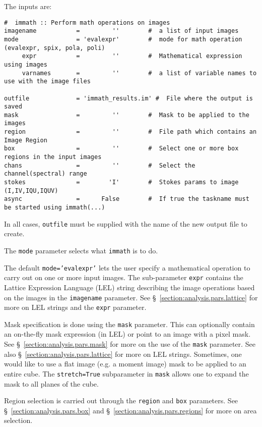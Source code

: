 The inputs are:
\small
\begin{verbatim}
#  immath :: Perform math operations on images
imagename           =         ''        #  a list of input images
mode                = 'evalexpr'        #  mode for math operation (evalexpr, spix, pola, poli)
     expr           =         ''        #  Mathematical expression using images
     varnames       =         ''        #  a list of variable names to use with the image files

outfile             = 'immath_results.im' #  File where the output is saved
mask                =         ''        #  Mask to be applied to the images
region              =         ''        #  File path which contains an Image Region
box                 =         ''        #  Select one or more box regions in the input images
chans               =         ''        #  Select the channel(spectral) range
stokes              =        'I'        #  Stokes params to image (I,IV,IQU,IQUV)
async               =      False        #  If true the taskname must be started using immath(...)
\end{verbatim}
\normalsize

In all cases, {\tt outfile} must be supplied with the name of the
new output file to create.

The {\tt mode} parameter selects what {\tt immath} is to do.

The default {\tt mode='evalexpr'} lets the user specify a mathematical
operation to carry out on one or more input images.
The sub-parameter {\tt expr} contains the Lattice Expression Language
(LEL) string describing the image operations based on the images
in the {\tt imagename} parameter.
See \S~\ref{section:analysis.pars.lattice} for more on LEL strings
and the {\tt expr} parameter.

Mask specification is done using the {\tt mask} parameter.  This can
optionally contain an on-the-fly mask expression (in LEL) or point to
an image with a pixel mask.  See \S~\ref{section:analysis.pars.mask}
for more on the use of the {\tt mask} parameter.  See also
\S~\ref{section:analysis.pars.lattice} for more on LEL
strings. Sometimes, one would like to use a flat image (e.g. a moment
image) mask to be applied to an entire cube. The {\tt stretch=True}
subparameter in {\tt mask} allows one to expand the mask to all planes
of the cube.

Region selection is carried out through the {\tt region} and {\tt box}
parameters.
See \S~\ref{section:analysis.pars.box} and
\S~\ref{section:analysis.pars.regions} for more on area
selection.

